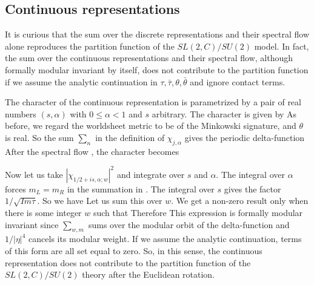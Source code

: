 \subsection{Continuous representations}

It is curious that the sum over the discrete representations
and their spectral flow alone reproduces the partition
function of the $SL(2,C)/SU(2)$ model. In fact, the sum over
the continuous representations and their spectral flow, although
formally modular invariant by itself, does
not contribute to the partition function if we assume
the analytic continuation in $\tau, \bar \tau, \theta, \bar\theta$ 
and ignore contact terms. 

The character of the continuous representation is parametrized
by a pair of real numbers $(s, \alpha)$ with $0 \leq \alpha < 1$
and $s $ arbitrary. The character is given by
As before, we regard the worldsheet metric to be of
the Minkowski signature, and $\theta$ is real. So the
sum $\sum_n$ in the definition of $\chi_{j, \alpha}$
gives the periodic delta-function 
After the spectral flow \spectral, the character becomes

Now let us take $|\chi_{1/2+is,\alpha ; w}|^2$ and integrate over
$s$ and $\alpha$. The integral over $\alpha$ forces $m_L = m_R$
in the summation in \contspec. The integral over $s$
gives the factor $1/\sqrt{Im \tau}$. So we have
Let us sum this over $w$. We get a non-zero result only when
there is some integer $w$ such that
Therefore
This expression is formally modular invariant since
$\sum_{w,m}$ sums over the modular orbit of the delta-function
and $1/|\eta|^4$ cancels its modular weight. If we assume the
analytic continuation, terms of this form are all set equal
to zero. So, in this sense, the continuous representation
does not contribute to the partition function of the
$SL(2,C)/SU(2)$ theory after the Euclidean rotation. 


\renewcommand{\baselinestretch}{0.87}













